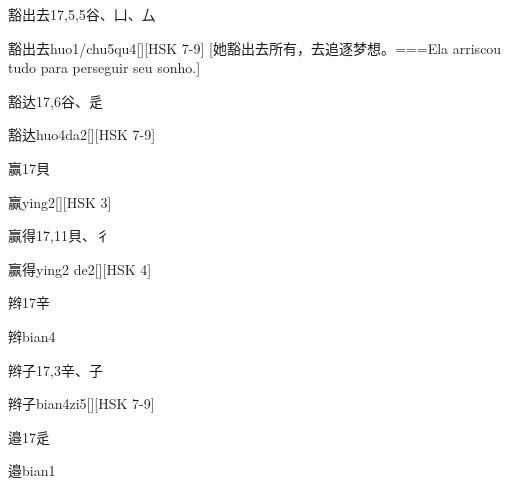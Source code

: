 \begin{Entry}{豁出去}{17,5,5}{⾕、⼐、⼛}
  \begin{Phonetics}{豁出去}{huo1/chu5qu4}[][HSK 7-9]
    [她豁出去所有，去追逐梦想。===Ela arriscou tudo para perseguir seu sonho.]
  \end{Phonetics}
\end{Entry}

\begin{Entry}{豁达}{17,6}{⾕、⾡}
  \begin{Phonetics}{豁达}{huo4da2}[][HSK 7-9]
  \end{Phonetics}
\end{Entry}

\begin{Entry}{赢}{17}{⾙}
  \begin{Phonetics}{赢}{ying2}[][HSK 3]
  \end{Phonetics}
\end{Entry}

\begin{Entry}{赢得}{17,11}{⾙、⼻}
  \begin{Phonetics}{赢得}{ying2 de2}[][HSK 4]
  \end{Phonetics}
\end{Entry}

\begin{Entry}{辫}{17}{⾟}
  \begin{Phonetics}{辫}{bian4}
  \end{Phonetics}
\end{Entry}

\begin{Entry}{辫子}{17,3}{⾟、⼦}
  \begin{Phonetics}{辫子}{bian4zi5}[][HSK 7-9]
  \end{Phonetics}
\end{Entry}

\begin{Entry}{邉}{17}{⾡}
  \begin{Phonetics}{邉}{bian1}
  \end{Phonetics}
\end{Entry}

